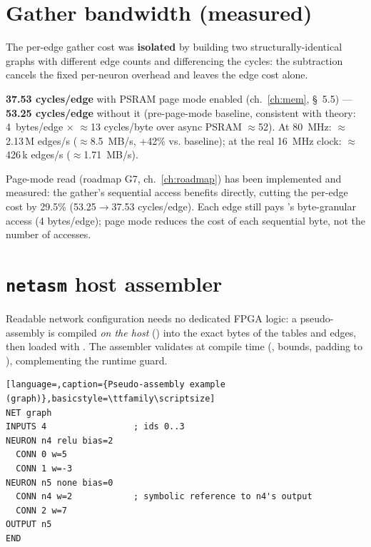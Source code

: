 \section{Gather bandwidth (measured)}
The per-edge gather cost was \textbf{isolated} by building two structurally-identical
graphs with different edge counts and differencing the cycles: the subtraction cancels the
fixed per-neuron overhead and leaves the edge cost alone.

\begin{fnspec}
\textbf{37.53 cycles/edge} with PSRAM page mode enabled (ch.~\ref{ch:mem}, \S~5.5) ---
\textbf{53.25 cycles/edge} without it (pre-page-mode baseline, consistent with theory:
4~bytes/edge $\times$ $\approx$13 cycles/byte over async PSRAM $\approx$52). At 80~MHz:
$\approx$2.13\,M edges/s ($\approx$8.5~MB/s, +42\% vs. baseline); at the real 16~MHz
clock: $\approx$426\,k edges/s ($\approx$1.71~MB/s).
\end{fnspec}

Page-mode read (roadmap G7, ch.~\ref{ch:roadmap}) has been implemented and measured: the
gather's sequential access benefits directly, cutting the per-edge cost by 29.5\%
(53.25$\to$37.53 cycles/edge). Each edge still pays 's
byte-granular access (4 bytes/edge); page mode reduces the cost of each sequential byte,
not the number of accesses.

\section{\texttt{netasm} host assembler}
Readable network configuration needs no dedicated FPGA logic: a pseudo-assembly is
compiled \emph{on the host} () into the exact bytes of the tables and
edges, then loaded with . The assembler validates at compile time
(,  bounds, padding to ),
complementing the runtime guard.

\begin{lstlisting}[language=,caption={Pseudo-assembly example (graph)},basicstyle=\ttfamily\scriptsize]
NET graph
INPUTS 4                 ; ids 0..3
NEURON n4 relu bias=2
  CONN 0 w=5
  CONN 1 w=-3
NEURON n5 none bias=0
  CONN n4 w=2            ; symbolic reference to n4's output
  CONN 2 w=7
OUTPUT n5
END
\end{lstlisting}
